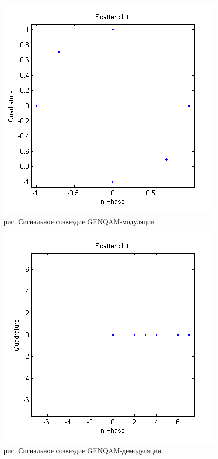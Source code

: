 \documentclass[10pt,a4paper]{report}
\begin{document}
\begin{figure}
\begin{center}
\includegraphics[angle=0, scale = 0.8]{9_7}\newline
рис.  Сигнальное созвездие GENQAM-модуляции\newline
\end{center}
\end{figure}
\begin{figure}
\begin{center}
\includegraphics[angle=0, scale = 0.8]{9_8}\newline
рис. Сигнальное созвездие GENQAM-демодуляции\newline
\end{center}
\end{figure}
\end{document}
